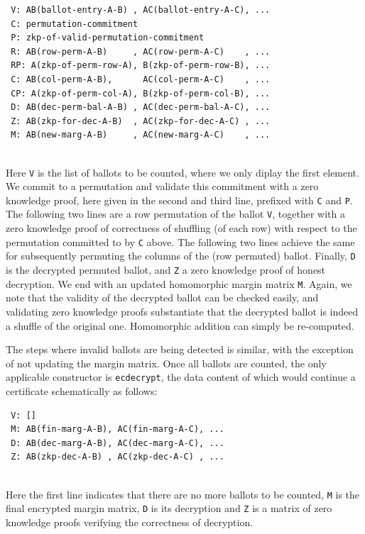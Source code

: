  {\small\begin{verbatim}
 V: AB(ballot-entry-A-B) , AC(ballot-entry-A-C), ...
 C: permutation-commitment
 P: zkp-of-valid-permutation-commitment
 R: AB(row-perm-A-B)     , AC(row-perm-A-C)    , ...
 RP: A(zkp-of-perm-row-A), B(zkp-of-perm-row-B), ... 
 C: AB(col-perm-A-B),      AC(col-perm-A-C)    , ...
 CP: A(zkp-of-perm-col-A), B(zkp-of-perm-col-B), ...
 D: AB(dec-perm-bal-A-B) , AC(dec-perm-bal-A-C), ...
 Z: AB(zkp-for-dec-A-B)  , AC(zkp-for-dec-A-C) , ...
 M: AB(new-marg-A-B)     , AC(new-marg-A-C)    , ...
 \end{verbatim}}

 \mbox{}\\[-5ex]
 Here \texttt{V} is the list of ballots to be counted, where we only
 diplay the first element. We
 commit to a permutation and validate this commitment with a zero
 knowledge proof, here given in the second and third line, prefixed
 with \texttt{C} and \texttt{P}. The following two lines are a row
 permutation of the ballot \texttt{V}, together with a zero
 knowledge proof of correctness of shuffling (of each row) with
 respect to the permutation committed to by \texttt{C} above. The
 following two lines achieve the same for subsequently permuting the
 columns of the (row permuted) ballot. Finally, \texttt{D} is the
 decrypted permuted ballot, and \texttt{Z} a zero knowledge proof of
 honest decryption. We end with an updated homomorphic margin
 matrix \texttt{M}. Again, we note that the validity of the
 decrypted ballot can be checked easily, and validating zero
 knowledge proofs substantiate that the decrypted ballot is indeed a
 shuffle of the original one. Homomorphic addition can simply be
 re-computed.

 The steps where invalid ballots are being detected is similar, with
 the exception of not updating the margin matrix. Once all ballots
 are counted, the only applicable constructor is \texttt{ecdecrypt},
 the data content of which would continue a certificate
 schematically as follows:

 {\small\begin{verbatim}
 V: []
 M: AB(fin-marg-A-B), AC(fin-marg-A-C), ...
 D: AB(dec-marg-A-B), AC(dec-marg-A-C), ...
 Z: AB(zkp-dec-A-B) , AC(zkp-dec-A-C) , ...
 \end{verbatim}}

 \mbox{}\\[-5ex]
 Here the first line indicates that there are no more ballots to be
 counted, \texttt{M} is the final encrypted margin matrix,
 \texttt{D} is its decryption and \texttt{Z} is a matrix of zero
 knowledge proofs verifying the correctness of decryption.

